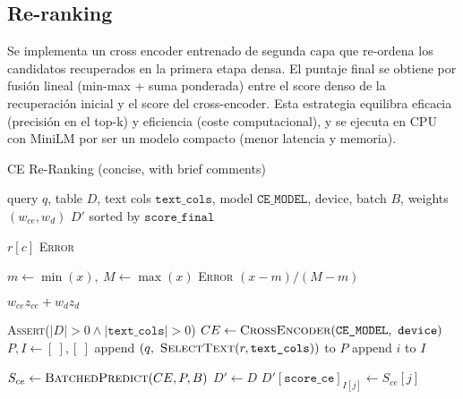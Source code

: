 \subsection{Re-ranking}
Se implementa un cross encoder entrenado de segunda capa que re-ordena los candidatos recuperados en la primera etapa densa. El puntaje final se obtiene por fusión lineal (min-max + suma ponderada)
entre el score denso de la recuperación inicial y el score del cross-encoder. 
Esta estrategia equilibra eficacia (precisión en el top-k) y eficiencia (coste computacional), y se ejecuta en CPU con MiniLM por ser un modelo compacto (menor latencia y memoria).
\begin{algorithmEN}[H]
  \caption{CE Re-Ranking (concise, with brief comments)}
  \begin{algorithmic}[1]
    \Require query $q$, table $D$, text cols $\texttt{text\_cols}$, model $\texttt{CE\_MODEL}$, device, batch $B$, weights $(w_{ce},w_d)$
    \Ensure $D'$ sorted by $\texttt{score\_final}$

                      
         \Return $r[c]$ \EndIf
      \EndFor
      \State \textsc{Error}                         
    \EndFunction

                              
      \State $m\gets\min(x),\ M\gets\max(x)$
       \State \textsc{Error}           
      \EndIf
      \State \Return $(x-m)/(M-m)$
    \EndFunction

            
      \State \Return $w_{ce}z_{ce}+w_d z_d$
    \EndFunction

    \State \textsc{Assert}($|D|>0 \land |\texttt{text\_cols}|>0$) 
    \State $CE\gets\textsc{CrossEncoder}(\texttt{CE\_MODEL},\ \texttt{device})$ 
    \State $P,I\gets[\ ],[\ ]$                       
      \State append $(q,\ \Call{SelectText}{r,\texttt{text\_cols}})$ to $P$ 
      \State append $i$ to $I$                       
    \EndFor

    \State $S_{ce}\gets \textsc{BatchedPredict}(CE,P,B)$ 
    \State $D'\gets D$                               
     $D'[\texttt{score\_ce}]_{I[j]}\gets S_{ce}[j]$ \EndFor {}


\end{algorithmic}
\end{algorithmEN}
